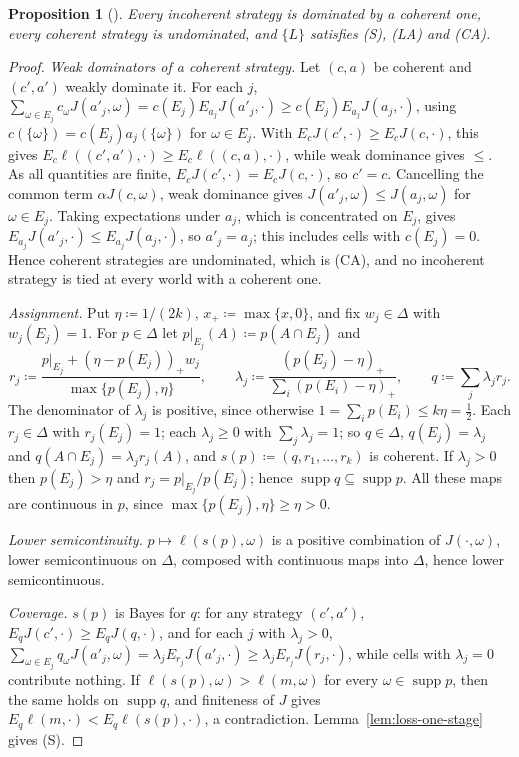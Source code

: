 \documentclass[11pt]{article}
\newcommand{\chg}[1]{{\color{red}#1}}
\newtheorem{proposition}[theorem]{Proposition}
\theoremstyle{definition}
\theoremstyle{remark}
\newcommand{\supp}{\operatorname{supp}}
\begin{document}
\begin{proposition}[{\cite{Briggs2020,Nielsen2021}}]\label{prop:updating}
Every incoherent strategy is dominated by a coherent one, every coherent strategy is undominated, and $\{L\}$ satisfies \chg{(S), (LA) and (CA)}.
\end{proposition}
\begin{proof}
\emph{Weak dominators of a coherent strategy.} Let $(c,a)$ be coherent and $(c',a')$ weakly dominate it. For each $j$, $\sum_{\omega\in E_j}c_\omega J(a'_j,\omega)=c(E_j)E_{a_j}J(a'_j,\cdot)\ge c(E_j)E_{a_j}J(a_j,\cdot)$, using $c(\{\omega\})=c(E_j)a_j(\{\omega\})$ for $\omega\in E_j$. With $E_cJ(c',\cdot)\ge E_cJ(c,\cdot)$, this gives $E_c\ell((c',a'),\cdot)\ge E_c\ell((c,a),\cdot)$, while weak dominance gives $\le$. As all quantities are finite, $E_cJ(c',\cdot)=E_cJ(c,\cdot)$, so $c'=c$. Cancelling the common term $\alpha J(c,\omega)$, weak dominance gives $J(a'_j,\omega)\le J(a_j,\omega)$ for $\omega\in E_j$. Taking expectations under $a_j$, which is concentrated on $E_j$, gives $E_{a_j}J(a'_j,\cdot)\le E_{a_j}J(a_j,\cdot)$, so $a'_j=a_j$; this includes cells with $c(E_j)=0$. Hence coherent strategies are undominated, which is \chg{(CA)}, and no incoherent strategy is tied at every world with a coherent one.

\emph{Assignment.} Put $\eta\coloneqq1/(2k)$, $x_+\coloneqq\max\{x,0\}$, and fix $w_j\in\Delta$ with $w_j(E_j)=1$. For $p\in\Delta$ let $p|_{E_j}(A)\coloneqq p(A\cap E_j)$ and
\[
r_j\coloneqq\frac{p|_{E_j}+(\eta-p(E_j))_+w_j}{\max\{p(E_j),\eta\}},\qquad \lambda_j\coloneqq\frac{(p(E_j)-\eta)_+}{\sum_i(p(E_i)-\eta)_+},\qquad q\coloneqq\sum_j\lambda_jr_j .
\]
The denominator of $\lambda_j$ is positive, since otherwise $1=\sum_ip(E_i)\le k\eta=\tfrac12$. Each $r_j\in\Delta$ with $r_j(E_j)=1$; each $\lambda_j\ge0$ with $\sum_j\lambda_j=1$; so $q\in\Delta$, $q(E_j)=\lambda_j$ and $q(A\cap E_j)=\lambda_jr_j(A)$, and $s(p)\coloneqq(q,r_1,\dots,r_k)$ is coherent. If $\lambda_j>0$ then $p(E_j)>\eta$ and $r_j=p|_{E_j}/p(E_j)$; hence $\supp q\subseteq\supp p$. All these maps are continuous in $p$, since $\max\{p(E_j),\eta\}\ge\eta>0$.

\emph{Lower semicontinuity.} $p\mapsto\ell(s(p),\omega)$ is a positive combination of $J(\cdot,\omega)$, lower semicontinuous on $\Delta$, composed with continuous maps into $\Delta$, hence lower semicontinuous.

\emph{Coverage.} $s(p)$ is Bayes for $q$: for any strategy $(c',a')$, $E_qJ(c',\cdot)\ge E_qJ(q,\cdot)$, and for each $j$ with $\lambda_j>0$, $\sum_{\omega\in E_j}q_\omega J(a'_j,\omega)=\lambda_jE_{r_j}J(a'_j,\cdot)\ge\lambda_jE_{r_j}J(r_j,\cdot)$, while cells with $\lambda_j=0$ contribute nothing. If $\ell(s(p),\omega)>\ell(m,\omega)$ for every $\omega\in\supp p$, then the same holds on $\supp q$, and finiteness of $J$ gives $E_q\ell(m,\cdot)<E_q\ell(s(p),\cdot)$, a contradiction. Lemma~\ref{lem:loss-one-stage} gives \chg{(S)}.
\end{proof}
\end{document}

